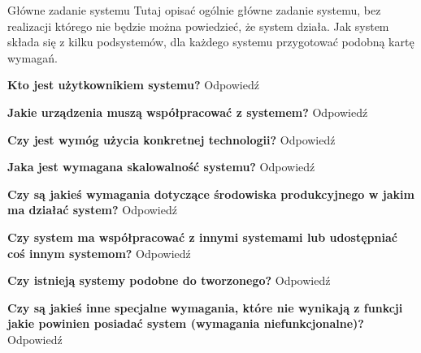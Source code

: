 \documentclass[a4paper]{article}
\begin{document}
    \begin{userstory}{Główne zadanie systemu}
        Tutaj opisać ogólnie główne zadanie systemu, bez realizacji którego nie będzie można powiedzieć, że system działa. Jak system składa się z kilku podsystemów, dla każdego systemu przygotować podobną kartę wymagań.
        \begin{questions}
            \item{
                \textbf{Kto jest użytkownikiem systemu?} Odpowiedź
            }
            \item{
                \textbf{Jakie urządzenia muszą współpracować z systemem?} Odpowiedź
            }
            \item{
                \textbf{Czy jest wymóg użycia konkretnej technologii?} Odpowiedź
            }
            \item{
                \textbf{Jaka jest wymagana skalowalność systemu?} Odpowiedź
            }
            \item{
                \textbf{Czy są jakieś wymagania dotyczące środowiska produkcyjnego w jakim ma działać system?} Odpowiedź
            }
            \item{
                \textbf{Czy system ma współpracować z innymi systemami lub udostępniać coś innym systemom?} Odpowiedź
            }
            \item{
                \textbf{Czy istnieją systemy podobne do tworzonego?} Odpowiedź
            }
            \item{
                \textbf{Czy są jakieś inne specjalne wymagania, które nie wynikają z funkcji jakie powinien posiadać system (wymagania niefunkcjonalne)?} Odpowiedź
            }
        \end{questions}
    \end{userstory}
\end{document}
